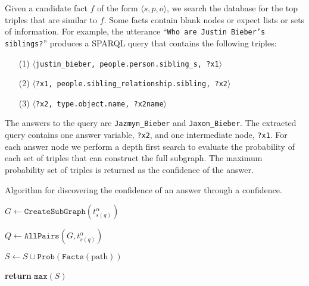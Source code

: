 Given a candidate fact \(f\) of the form \(\langle s, p, o \rangle\), we search
the database for the top triples that are similar to \(f\).
Some facts contain blank nodes or expect lists or sets of information.
For example, the utterance ``\texttt{Who are Justin Bieber's siblings?}'' produces 
a SPARQL query that contains the following triples: 
\begin{enumerate}
\item[(1)] \(\langle\)\texttt{justin\_bieber, people.person.sibling\_s, ?x1}\(\rangle\)
\item[(2)] \(\langle\)\texttt{?x1, people.sibling\_relationship.sibling, ?x2}\(\rangle\)
\item[(3)] \(\langle\)\texttt{?x2, type.object.name, ?x2name}\(\rangle\)
\end{enumerate}

The answers to the query are \texttt{Jazmyn\_Bieber} and \texttt{Jaxon\_Bieber}.
The extracted query contains one answer variable, \texttt{?x2}, and one intermediate node, \texttt{?x1}.
For each answer node we perform a depth first
search to evaluate the probability of each set of triples that can construct
the full subgraph.
The maximum probability set of triples is returned as the confidence of the answer.


\begin{algorithm}
\caption{Algorithm for discovering the confidence of an answer through a confidence.}
\label{alg:probqa-truthfulness}
\begin{algorithmic}[1]

\State $G \leftarrow \mathtt{CreateSubGraph}(t_{s(q)}^\alpha)$ \label{algo:line:createsubgraph}

\State $Q \leftarrow \mathtt{AllPairs}(G, t_{s(q)}^\alpha)$  \label{algo:line:allpairs}

  \label{algo:line:jointprob-start}
  \State $S \leftarrow S \cup \mathtt{Prob}(\mathtt{Facts}(\text{path}))$ 
\EndFor \label{algo:line:jointprob-end}

\State \textbf{return} $\mathtt{max}(S)$
\EndProcedure
\end{algorithmic}
\end{algorithm}


